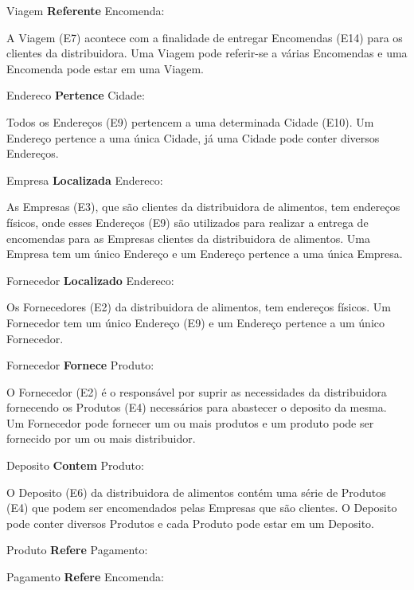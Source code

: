 \documentclass[12pt, onecolumn, titlepage]{article}
\begin{document}
\begin{description}
\item Viagem \textbf{Referente} Encomenda: 
\item \qquad A Viagem (E7) acontece com a finalidade de entregar Encomendas (E14) para os clientes da distribuidora. Uma Viagem pode referir-se a várias Encomendas e uma Encomenda pode estar em uma Viagem.

\item Endereco \textbf{Pertence} Cidade: 
\item \qquad Todos os Endereços (E9) pertencem a uma determinada Cidade (E10). Um Endereço pertence a uma única Cidade, já uma Cidade pode conter diversos Endereços.

\item Empresa \textbf{Localizada} Endereco: 
\item \qquad As Empresas (E3), que são clientes da distribuidora de alimentos, tem endereços físicos, onde esses Endereços (E9) são utilizados para realizar a entrega de encomendas para as Empresas clientes da distribuidora de alimentos. Uma Empresa tem um único Endereço e um Endereço pertence a uma única Empresa.

\item Fornecedor \textbf{Localizado} Endereco: 
\item \qquad Os Fornecedores (E2) da distribuidora de alimentos, tem endereços físicos. Um Fornecedor tem um único Endereço (E9) e um Endereço pertence a um único Fornecedor.

\item Fornecedor \textbf{Fornece} Produto: 
\item \qquad O Fornecedor (E2) é o responsável por suprir as necessidades da distribuidora fornecendo os Produtos (E4) necessários para abastecer o deposito da mesma. Um Fornecedor pode fornecer um ou mais produtos e um produto pode ser fornecido por um ou mais distribuidor.

\item Deposito \textbf{Contem} Produto: 
\item \qquad O Deposito (E6) da distribuidora de alimentos contém uma série de Produtos (E4) que podem ser encomendados pelas Empresas que são clientes. O Deposito pode conter diversos Produtos e cada Produto pode estar em um Deposito.

\item Produto \textbf{Refere} Pagamento: 
\item \qquad

\item Pagamento \textbf{Refere} Encomenda: 
\item \qquad


\end{description}
\end{document}
